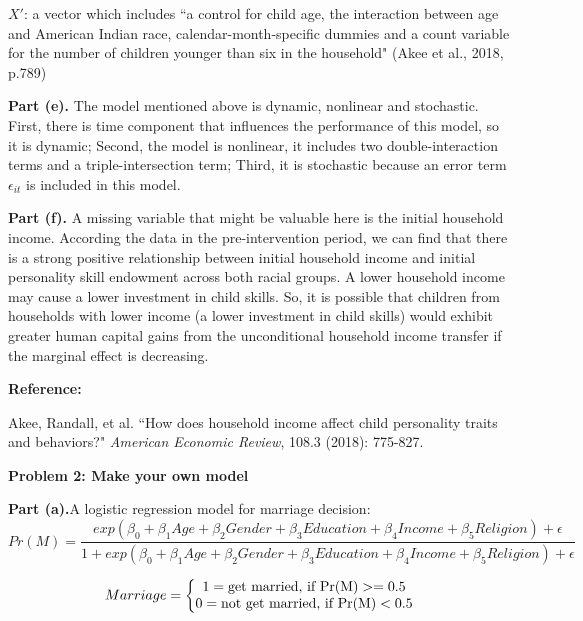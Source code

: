 \documentclass[letterpaper,12pt]{article}
\theoremstyle{definition}
\begin{document}
$ {X}' $:  a vector which includes ``a control for child age, the interaction between age and American Indian race, calendar-month-specific dummies and a count variable for the number of children younger than six in the household" (Akee et al., 2018, p.789)

\textbf{Part (e).} The model mentioned above is dynamic, nonlinear and stochastic.\\
First, there is time component that influences the performance of this model, so it is dynamic; Second, the model is nonlinear, it includes two double-interaction terms and a triple-intersection term; Third, it is stochastic because an error term $ \epsilon _{it} $ is included in this model.


\textbf{Part (f).} A missing variable that might be valuable here is the initial household income. According the data in the pre-intervention period, we can find that there is a strong positive relationship between initial household income and initial personality skill endowment across both racial groups. A lower household income may cause a lower investment in child skills. So, it is possible that children from households with lower income (a lower investment in child skills) would exhibit greater human capital gains from the unconditional household income transfer if the marginal effect is decreasing. 

\vspace{30mm}
 \textbf{\large{Reference:}}

Akee, Randall, et al. ``How does household income affect child personality traits and behaviors?" \emph{American Economic Review}, 108.3 (2018): 775-827.

\vspace{180mm}

\noindent\textbf{Problem 2: Make your own model}

\textbf{Part (a).}A logistic regression model for marriage decision: \\

\begin{equation*}
Pr(M)=\frac{exp(\beta _{0}+\beta _{1}Age+\beta _{2}Gender+\beta _{3}Education+\beta _{4}Income+\beta _{5}Religion)+\epsilon }{1+exp(\beta _{0}+\beta _{1}Age+\beta _{2}Gender+\beta _{3}Education+\beta _{4}Income+\beta _{5}Religion)+\epsilon}
\end{equation*}

\begin{equation*}
Marriage = \left\{\begin{matrix}
1=\textup{get married,} \ \textup{if Pr(M)} > =0.5 \\ 0=\textup{not get married,} \ \textup{if Pr(M)} < 0.5
\end{matrix}\right.
\end{equation*}
\end{document}
